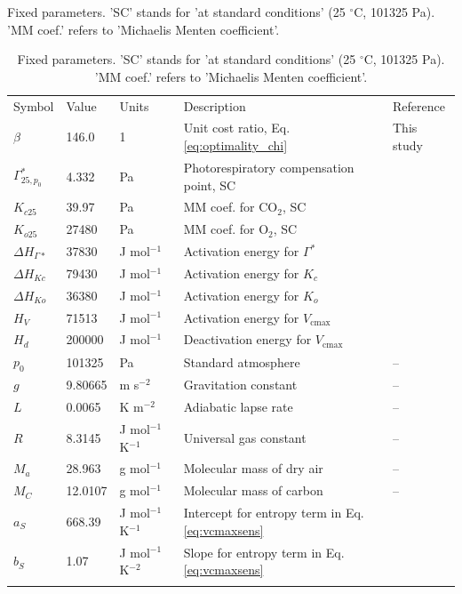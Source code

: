 \documentclass[gmd, manuscript]{copernicus}
\newcommand{\vcmax}{$V_{\text{cmax}}$}
\begin{document}
\clearpage

\begin{table}[t]
\caption{Fixed parameters. 'SC' stands for 'at standard conditions' (25 $^{\circ}$C, 101325 Pa). 'MM coef.' refers to 'Michaelis Menten coefficient'.}
\begin{tabular}{lllll}
  \tophline
    Symbol     & Value   & Units         & Description           &  Reference   \\
  \middlehline
    $\beta$      & 146.0     & 1             & Unit cost ratio, Eq. \ref{eq:optimality_chi} & This study \\
  $\Gamma^\ast_{25, p_0}$ & 4.332 & Pa & Photorespiratory compensation point, SC & \citet{bernacchi01} \\
  $K_{c25}$    & 39.97   & Pa            & MM coef. for CO$_2$, SC&  \citet{bernacchi01} \\
  $K_{o25}$    & 27480   & Pa            & MM coef. for O$_2$, SC&  \citet{bernacchi01} \\
  $\Delta H_{\Gamma\ast}$ & 37830 & J mol$^{-1}$ & Activation energy for $\Gamma^\ast$  & \citet{bernacchi01} \\
  $\Delta H_{Kc}$ & 79430  & J mol$^{-1}$  & Activation energy for $K_c$&  \citet{bernacchi01} \\
  $\Delta H_{Ko}$ & 36380  & J mol$^{-1}$  & Activation energy for $K_o$&  \citet{bernacchi01} \\
  $H_V$        & 71513   & J mol$^{-1}$  & Activation energy for \vcmax\ & \citet{kattge07} \\
  $H_d$        & 200000   & J mol$^{-1}$  & Deactivation energy for \vcmax\ & \citet{kattge07} \\
  $p_0$        & 101325  & Pa            & Standard atmosphere   & -- \\
  $g$          & 9.80665 & m s$^{-2}$    & Gravitation constant  & -- \\
  $L$          & 0.0065  & K m$^{-2}$    & Adiabatic lapse rate  & -- \\
  $R$          & 8.3145  & J mol$^{-1}$ K$^{-1}$ & Universal gas constant & -- \\
  $M_a$        & 28.963  & g mol$^{-1}$  & Molecular mass of dry air & -- \\
    $M_C$        & 12.0107 & g mol$^{-1} $ & Molecular mass of carbon & -- \\ 
  $a_S$        & 668.39  & J mol$^{-1}$ K$^{-1}$ & Intercept for entropy term in Eq. \ref{eq:vcmaxsens} & \citet{kattge07} \\
  $b_S$        & 1.07  & J mol$^{-1}$ K$^{-2}$ & Slope for entropy term in Eq. \ref{eq:vcmaxsens} & \citet{kattge07} \\
  \bottomhline
\end{tabular}
\caption{Fixed parameters. 'SC' stands for 'at standard conditions' (25 $^{\circ}$C, 101325 Pa). 'MM coef.' refers to 'Michaelis Menten coefficient'.}
\label{tab:params}
\end{table}
\clearpage
\end{document}
